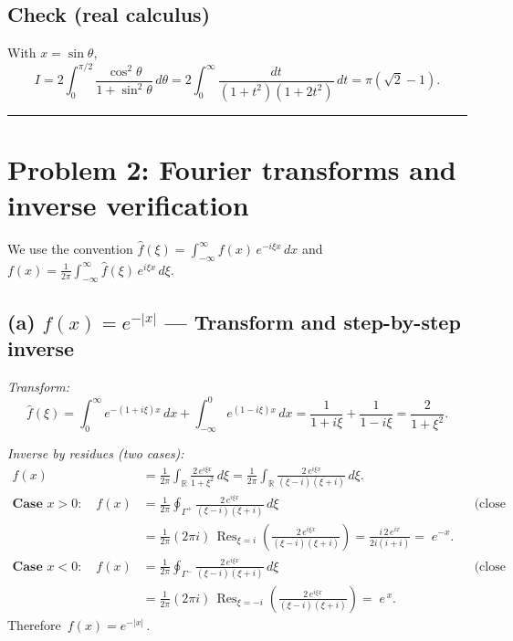 \documentclass[11pt]{article}
\DeclareMathOperator{\Res}{Res}
\begin{document}
	\subsection*{Check (real calculus)}
	With \(x=\sin\theta\),
	\[
	I=2\int_{0}^{\pi/2}\frac{\cos^{2}\theta}{1+\sin^{2}\theta}\,d\theta
	=2\int_{0}^{\infty}\frac{dt}{(1+t^{2})(1+2t^{2})}\,dt
	=\pi(\sqrt2-1).
	\]
	
	\bigskip\hrule\bigskip
	
	\section{Problem 2: Fourier transforms and inverse verification}
	
	We use the convention \(\displaystyle \widehat f(\xi)=\int_{-\infty}^{\infty} f(x)\,e^{-i\xi x}\,dx\) and
	\(\displaystyle f(x)=\frac{1}{2\pi}\int_{-\infty}^{\infty}\widehat f(\xi)\,e^{i\xi x}\,d\xi\).
	
	\subsection*{(a) \(f(x)=e^{-|x|}\) — Transform and step-by-step inverse}
	\textit{Transform:}
	\[
	\widehat f(\xi)
	=\int_{0}^{\infty}e^{-(1+i\xi)x}\,dx+\int_{-\infty}^{0}e^{(1-i\xi)x}\,dx
	=\frac{1}{1+i\xi}+\frac{1}{1-i\xi}
	=\boxed{\frac{2}{1+\xi^{2}}}.
	\]
	
	\textit{Inverse by residues (two cases):}
	\begin{align*}
		f(x)
		&=\frac{1}{2\pi}\int_{\mathbb R}\frac{2\,e^{i\xi x}}{1+\xi^{2}}\,d\xi
		=\frac{1}{2\pi}\int_{\mathbb R}\frac{2\,e^{i\xi x}}{(\xi-i)(\xi+i)}\,d\xi.
		\\[0.25em]
		\textbf{Case }x>0:\quad
		f(x)
		&=\frac{1}{2\pi}\oint_{\Gamma^+}\frac{2\,e^{i\xi x}}{(\xi-i)(\xi+i)}\,d\xi
		&&\text{(close upward; Jordan’s lemma)}\\
		&=\frac{1}{2\pi}(2\pi i)\,\Res_{\xi=i}\!\left(\frac{2\,e^{i\xi x}}{(\xi-i)(\xi+i)}\right)
		=\frac{i\,2\,e^{ix}}{2i( i+i)}=\;e^{-x}.
		\\[0.35em]
		\textbf{Case }x<0:\quad
		f(x)
		&=\frac{1}{2\pi}\oint_{\Gamma^-}\frac{2\,e^{i\xi x}}{(\xi-i)(\xi+i)}\,d\xi
		&&\text{(close downward)}\\
		&=\frac{1}{2\pi}(2\pi i)\,\Res_{\xi=-i}\!\left(\frac{2\,e^{i\xi x}}{(\xi-i)(\xi+i)}\right)
		=\;e^{\,x}.
	\end{align*}
	Therefore \(\boxed{\,f(x)=e^{-|x|}\,}\).
	
\end{document}

